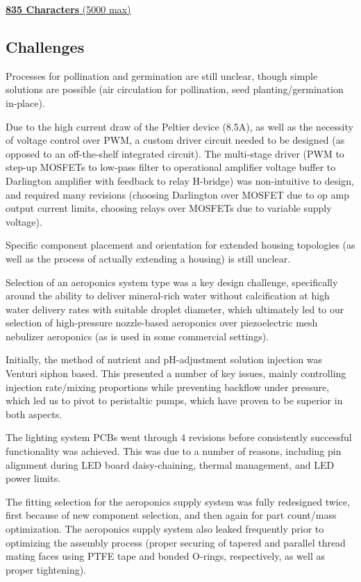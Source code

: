 \documentclass{../tex/report}
\begin{document}
\uline{\textbf{835 Characters} (5000 max)}

\subsection{Challenges}

Processes for pollination and germination are still unclear, though simple solutions are possible (air circulation for pollination, seed planting/germination in-place).

Due to the high current draw of the Peltier device (8.5A), as well as the necessity of voltage control over PWM, a custom driver circuit needed to be designed (as opposed to an off-the-shelf integrated circuit). The multi-stage driver (PWM to step-up MOSFETs to low-pass filter to operational amplifier voltage buffer to Darlington amplifier with feedback to relay H-bridge) was non-intuitive to design, and required many revisions (choosing Darlington over MOSFET due to op amp output current limits, choosing relays over MOSFETs due to variable supply voltage).

Specific component placement and orientation for extended housing topologies (as well as the process of actually extending a housing) is still unclear.

Selection of an aeroponics system type was a key design challenge, specifically around the ability to deliver mineral-rich water without calcification at high water delivery rates with suitable droplet diameter, which ultimately led to our selection of high-pressure nozzle-based aeroponics over piezoelectric mesh nebulizer aeroponics (as is used in some commercial settings).

Initially, the method of nutrient and pH-adjustment solution injection was Venturi siphon based. This presented a number of key issues, mainly controlling injection rate/mixing proportions while preventing backflow under pressure, which led us to pivot to peristaltic pumps, which have proven to be superior in both aspects.

\clearpage

The lighting system PCBs went through 4 revisions before consistently successful functionality was achieved. This was due to a number of reasons, including pin alignment during LED board daisy-chaining, thermal management, and LED power limits.

The fitting selection for the aeroponics supply system was fully redesigned twice, first because of new component selection, and then again for part count/mass optimization. The aeroponics supply system also leaked frequently prior to optimizing the assembly process (proper securing of tapered and parallel thread mating faces using PTFE tape and bonded O-rings, respectively, as well as proper tightening).
\end{document}
